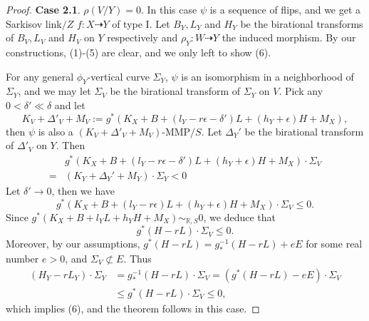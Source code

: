 \documentclass[11pt]{amsart}
\numberwithin{equation}{section}
\theoremstyle{definition}
\theoremstyle{definition}
\theoremstyle{definition}
\begin{document}
\begin{proof}
\medskip

\noindent\textbf{Case 2.1}\label{cons case 2.1}. $\rho(V/Y)=0$. In this case $\psi$ is a sequence of flips, and we get a Sarkisov link$/Z$ $f:X\dashrightarrow Y$ of type I. Let $B_Y,L_Y$ and $H_Y$ be the birational transforms of $B_V,L_V$ and $H_V$ on $Y$ respectively and $\rho_Y: W\dashrightarrow Y$ the induced morphism. By our constructions, (1)-(5) are clear, and we only left to show (6).

For any general $\phi_Y$-vertical curve $\Sigma_Y$, $\psi$ is an isomorphism in a neighborhood of $\Sigma_Y$, and we may let $\Sigma_V$ be the birational transform of $\Sigma_Y$ on $V$. Pick any $0<\delta'\ll\delta$ and let
$$K_V+\Delta'_V+M_V:=g^*(K_X+B+(l_Y-r\epsilon-\delta')L+(h_Y+\epsilon)H+M_X),$$
then $\psi$ is also a $(K_V+\Delta'_V+M_V)$-MMP$/S$. Let $\Delta_Y'$ be the birational transform of $\Delta'_V$ on $Y$. Then
\begin{align*}
&g^*(K_X+B+(l_Y-r\epsilon-\delta')L+(h_Y+\epsilon)H+M_X)\cdot\Sigma_V\\
=&(K_Y+\Delta_Y'+M_Y)\cdot\Sigma_Y<0
\end{align*}
Let $\delta'\rightarrow 0$, then we have
$$g^*(K_X+B+(l_Y-r\epsilon)L+(h_Y+\epsilon)H+M_X)\cdot\Sigma_V\leq 0.$$
Since $g^*(K_X+B+l_YL+h_YH+M_X)\sim_{\mathbb R,S}0$, we deduce that
$$g^*(H-rL)\cdot\Sigma_V\leq 0.$$
Moreover, by our assumptions, $g^*(H-rL)=g^{-1}_*(H-rL)+eE$ for some real number $e>0$, and $\Sigma_V\not\subset E$. Thus
\begin{align*}
    (H_Y-rL_Y)\cdot\Sigma_Y&=g^{-1}_*(H-rL)\cdot\Sigma_V=(g^*(H-rL)-eE)\cdot\Sigma_V\\
    &\leq g^*(H-rL)\cdot\Sigma_V\leq 0,
\end{align*}
which implies (6), and the theorem follows in this case.

\medskip



\end{proof}
\end{document}
